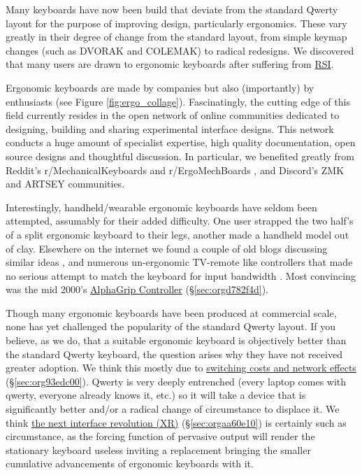 \documentclass[logo,bsc,singlespacing,parskip]{infthesis}
\begin{document}
Many keyboards have now been build that deviate from the standard Qwerty layout for the purpose of improving design, particularly ergonomics.
These vary greatly in their degree of change from the standard layout, from simple keymap changes (such as DVORAK and COLEMAK) to radical redesigns.
We discovered that many users are drawn to ergonomic keyboards after suffering from \hyperref[org503fc2d]{RSI}.

Ergonomic keyboards are made by companies but also (importantly) by enthusiasts (see Figure \ref{fig:ergo_collage}).
Fascinatingly, the cutting edge of this field currently resides in the open network of online communities dedicated to designing, building and sharing  experimental interface designs.
This network conducts a huge amount of specialist expertise, high quality documentation, open source designs and thoughtful discussion.
In particular, we benefited greatly from Reddit's r/MechanicalKeyboards \autocite{MechanicalKeyboardsAllClick} and  r/ErgoMechBoards \autocite{ErgoMechBoards} , and Discord's ZMK and ARTSEY communities.

Interestingly, handheld/wearable ergonomic keyboards have seldom been attempted, assumably for their added difficulty.
One user strapped the two half's of a split ergonomic keyboard to their legs, another made a handheld model out of clay.
Elsewhere on the internet we found a couple of old blogs discussing similar ideas \autocite{ChorditeAnotherOnehand}, and numerous un-ergonomic TV-remote like controllers that made no serious attempt to match the keyboard for input bandwidth \autocite{TwiddlerTekGear} .
Most convincing was the mid 2000's \hyperref[sec:orgd782f4d]{AlphaGrip Controller} (\S \ref{sec:orgd782f4d}).

Though many ergonomic keyboards have been produced at commercial scale, none has yet challenged the popularity of the standard Qwerty layout.
If you believe, as we do, that a suitable ergonomic keyboard is objectively better than the standard Qwerty keyboard, the question arises why they have not received greater adoption.
We think this mostly due to \hyperref[sec:org93edc00]{switching costs and network effects} (\S \ref{sec:org93edc00}).
Qwerty is very deeply entrenched (every laptop comes with qwerty, everyone already knows it, etc.) so it will take a device that is significantly better and/or a radical change of circumstance to displace it.
We think \hyperref[sec:orgaa60e10]{the next interface revolution (XR)} (\S \ref{sec:orgaa60e10}) is certainly such as circumstance, as the forcing function of pervasive output will render the stationary keyboard useless inviting a replacement bringing the smaller cumulative advancements of ergonomic keyboards with it.
\end{document}
